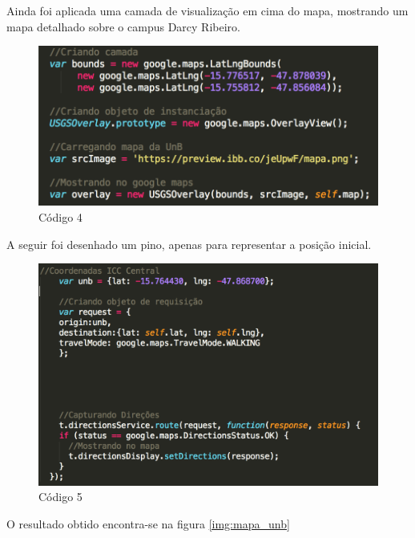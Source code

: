 Ainda foi aplicada uma camada de visualização em cima do mapa, mostrando um mapa detalhado sobre o campus Darcy Ribeiro.

\graphicspath{{figuras/}}
\begin{figure}[!htb]
\centering
\includegraphics[scale=0.80]{codigo4}
\caption{Código 4}
\label{img:codigo4}
\end{figure}

A seguir foi desenhado um pino, apenas para representar a posição inicial.

\graphicspath{{figuras/}}
\begin{figure}[!htb]
\centering
\includegraphics[scale=0.80]{codigo5}
\caption{Código 5}
\label{img:codigo5}
\end{figure}

\newpage

O resultado obtido encontra-se na figura \ref{img:mapa_unb}

